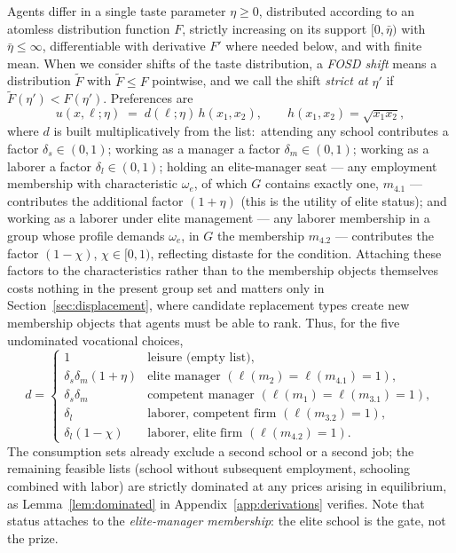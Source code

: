 \documentclass[12pt,letterpaper]{article}
\theoremstyle{definition}
\begin{document}
Agents differ in a single taste parameter $\eta\geq 0$, distributed according to an atomless distribution function $F$, strictly increasing on its support $[0,\bar\eta)$ with $\bar\eta\leq\infty$, differentiable with derivative $F'$ where needed below, and with finite mean.
When we consider shifts of the taste distribution, a \emph{FOSD shift} means a distribution $\tilde F$ with $\tilde F\leq F$ pointwise, and we call the shift \emph{strict at} $\eta'$ if $\tilde F(\eta')<F(\eta')$.
Preferences are
\begin{equation}\label{eq:utility}
  u(x,\ell;\eta) \;=\; d(\ell;\eta)\, h(x_1,x_2),
  \qquad h(x_1,x_2)=\sqrt{x_1 x_2},
\end{equation}
where $d$ is built multiplicatively from the list:\ attending any school contributes a factor $\delta_s\in(0,1)$; working as a manager a factor $\delta_m\in(0,1)$; working as a laborer a factor $\delta_l\in(0,1)$; holding an elite-manager seat --- any employment membership with characteristic $\omega_e$, of which $G$ contains exactly one, $m_{4.1}$ --- contributes the additional factor $(1+\eta)$ (this is the utility of elite status); and working as a laborer under elite management --- any laborer membership in a group whose profile demands $\omega_e$, in $G$ the membership $m_{4.2}$ --- contributes the factor $(1-\chi)$, $\chi\in[0,1)$, reflecting distaste for the condition.
Attaching these factors to the characteristics rather than to the membership objects themselves costs nothing in the present group set and matters only in Section~\ref{sec:displacement}, where candidate replacement types create new membership objects that agents must be able to rank.
Thus, for the five undominated vocational choices, \[ d = \begin{cases} 1 & \text{leisure (empty list)},\\ \delta_s\delta_m(1+\eta) & \text{elite manager } (\ell(m_2)=\ell(m_{4.1})=1),\\ \delta_s\delta_m & \text{competent manager } (\ell(m_1)=\ell(m_{3.1})=1),\\ \delta_l & \text{laborer, competent firm } (\ell(m_{3.2})=1),\\ \delta_l(1-\chi) & \text{laborer, elite firm } (\ell(m_{4.2})=1).
\end{cases}
\] The consumption sets already exclude a second school or a second job; the remaining feasible lists (school without subsequent employment, schooling combined with labor) are strictly dominated at any prices arising in equilibrium, as Lemma~\ref{lem:dominated} in Appendix~\ref{app:derivations} verifies.
Note that status attaches to the \emph{elite-manager membership}: the elite school is the gate, not the prize.
\end{document}
